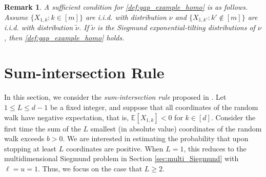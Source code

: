 \documentclass[aap,preprint]{imsart}
\newcommand{\Mstar}{[m]}
\newcommand{\bR}{{\mathbb{R}}}
\theoremstyle{plain}
\newtheorem{remark}{Remark}[section]
\theoremstyle{definition}
\begin{document}
\begin{remark}
A sufficient condition for \eqref{def:gap_example_homo} is as follows. Assume $\{X_{1,k}: k \in \Mstar\}$ are i.i.d. with distribution $\nu$ and $\{X_{1,k'}: k' \not\in \Mstar\}$ are i.i.d. with distribution $\tilde{\nu}$. If $\tilde{\nu}$ is the Siegmund exponential-tilting distributions of $\nu$, then \eqref{def:gap_example_homo} holds.
\end{remark}

\section{Sum-intersection Rule}\label{sec:sum_inter}
In this section, we consider the \textit{sum-intersection rule} proposed in \cite{song2019sequential}. Let $1 \leq L \leq d-1$ be a fixed integer, and suppose that all coordinates of the random walk have negative expectation, that is,  $\mathbb{E}[X_{1,k}] < 0$ for $k \in [d]$. Consider the first time the sum of the $L$ smallest (in absolute value) coordinates of the random walk exceeds $b>0$. We are interested in   estimating the probability that upon stopping at least $L$ coordinates are positive. When $L = 1$, this reduces to the multidimensional Siegmund problem in Section \ref{sec:multi_Siegmund} with $\ell=u=1$. Thus, we focus on the case that $L \geq 2$.
\end{document}

